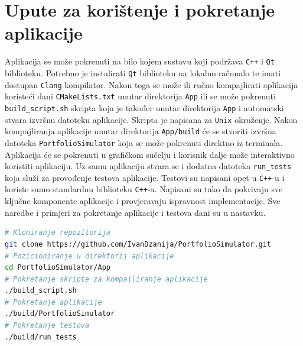 \documentclass[zavrsnirad, upload]{fer}
\begin{document}
\chapter{Upute za korištenje i pokretanje aplikacije}
\label{sek:upute_za_koristenje}
Aplikacija se može pokrenuti na bilo kojem sustavu koji podržava
\texttt{C++} i \texttt{Qt} biblioteku. Potrebno je instalirati \texttt{Qt}
biblioteku na lokalno računalo te imati dostupan \texttt{Clang} kompilator.
Nakon toga se može ili ručno kompajlirati aplikacija koristeći dani
\texttt{CMakeLists.txt} unutar direktorija \texttt{App} ili se može
pokrenuti \texttt{build\_script.sh} skripta koja je također unutar direktorija
\texttt{App} i automatski stvara izvršnu datoteku aplikacije. Skripta je
napisana za \texttt{Unix} okruženje.
Nakon kompajliranja aplikacije unutar direktorija \texttt{App/build} će se
stvoriti izvršna datoteka \texttt{PortfolioSimulator} koja se može pokrenuti
direktno iz terminala. Aplikacija će se pokrenuti u grafičkom sučelju
i korisnik dalje može interaktivno koristiti aplikaciju. Uz samu aplikaciju
stvara se i dodatna datoteka \texttt{run\_tests} koja služi za provođenje
testova aplikacije. Testovi su napisani opet u \texttt{C++}-u i koriste samo standardnu
biblioteku \texttt{C++}-a. Napisani su tako da pokrivaju sve ključne
komponente aplikacije i provjeravaju ispravnost implementacije.
Sve naredbe i primjeri za pokretanje aplikacije i testova dani su u
nastavku.
\begin{lstlisting}[language=bash, caption={Primjeri naredbi za pokretanje aplikacije i testova}]
# Kloniranje repozitorija
git clone https://github.com/IvanDzanija/PortfolioSimulator.git
# Pozicioniranje u direktorij aplikacije
cd PortfolioSimulator/App
# Pokretanje skripte za kompajliranje aplikacije
./build_script.sh
# Pokretanje aplikacije
./build/PortfolioSimulator
# Pokretanje testova
./build/run_tests
\end{lstlisting}




\end{document}
